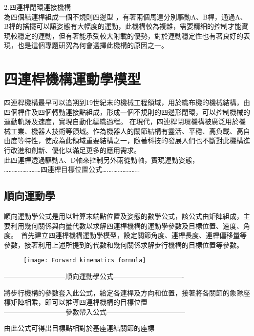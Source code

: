 2.四連桿閉環連接機構\\
為四個結連桿組成一個不規則四邊型 ，有著兩個馬達分別驅動A、B桿，通過A、B桿的搖擺可以讓姿態有大幅度的運動，此機構較為複雜，需要精細的控制才能實現較穩定的運動，但有著能承受較大附載的優勢，對於運動穩定性也有著良好的表現，也是這個專題研究為何會選擇此機構的原因之一。\\

\section{四連桿機構運動學模型}

四連桿機構最早可以追朔到19世紀末的機械工程領域，用於織布機的機械結構，由四個桿件及四個轉動連接點組成，形成一個不規則的四邊形閉環，可以控制機械的運動軌跡及速度，實現自動化編織過程。
在現代，四連桿閉環機構被廣泛用於機械工業、機器人技術等領域。作為機器人的關節結構有靈活、平穩、高負載、高自由度等特性，使成為此領域重要結構之一，隨著科技的發展人們也不斷對此機構進行改進和創新、優化以滿足更多的應用需求。\\
 此四連桿透過驅動A、D軸來控制另外兩從動軸，實現運動姿態，\\

……………………四連桿目標位置公式….………………..

\subsection{順向運動學}
順向運動學公式是用以計算末端點位置及姿態的數學公式，該公式由矩陣組成，主要利用幾何關係與向量代數以求解四連桿機構的運動學參數及目標位置、速度、角度。\
首先建立四連桿機構運動學模型，設定關節角度、連桿長度、連桿偏移量等參數，接著利用上述所提到的代數和幾何關係求解步行機構的目標位置等參數。\\

 \begin{figure}
        \texttt{[image: Forward kinematics formula]} %
    \end{figure}

---------------------------順向運動學公式-------------------------------


將步行機構的參數套入此公式，給定各連桿及方向和位置，接著將各關節的象隊座標矩陣相乘，即可以推導四連桿機構的目標位置\\

---------------------------參數帶入公式-----------------------------------


由此公式可得出目標點相對於基座連結關節的座標\\

